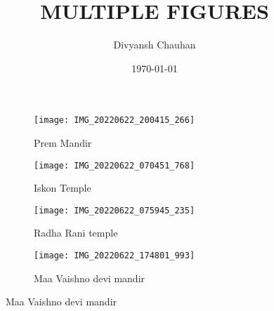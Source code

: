 \documentclass{article}
\title{MULTIPLE FIGURES}
\author{Divyansh Chauhan}
\date{\today}
\begin{document}
\maketitle
\begin{figure}
\begin{subfigure}{.5\textwidth}
  \centering
  \texttt{[image: IMG\_20220622\_200415\_266]}
  \caption{Prem Mandir}
  \label{fig:sfig1}
\end{subfigure}
\begin{subfigure}{.5\textwidth}
  \centering
  \texttt{[image: IMG\_20220622\_070451\_768]}
  \caption{Iskon Temple}
  \label{fig:sfig2}
\end{subfigure}
\newline
\begin{subfigure}{.5\textwidth}
  \centering
  \texttt{[image: IMG\_20220622\_075945\_235]}
  \caption{Radha Rani temple}
  \label{fig:sfig1}
\end{subfigure}
\newline
\begin{subfigure}{.5\textwidth}
  \centering
  \texttt{[image: IMG\_20220622\_174801\_993]}
  \caption{Maa Vaishno devi mandir}
  \label{fig:sfig2}
\end{subfigure}
\end{figure}
\end{document}
